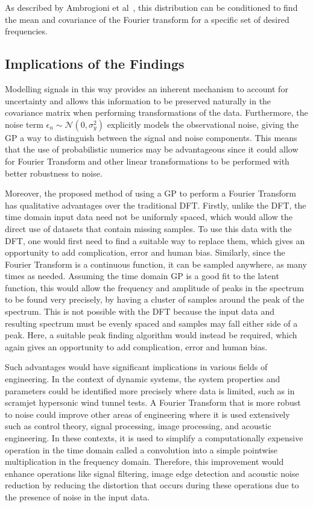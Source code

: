 \documentclass[12pt]{article}
\begin{document}
    \noindent As described by Ambrogioni et al~\cite{Ambrogioni2018}, this distribution can be conditioned to find the mean and covariance of the Fourier transform for a specific set of desired frequencies.

    \subsection{Implications of the Findings}
    Modelling signals in this way provides an inherent mechanism to account for uncertainty and allows this information to be preserved naturally in the covariance matrix when performing transformations of the data.
    Furthermore, the noise term  $\epsilon_n \sim \mathcal{N}(0, \sigma^2_y)$ explicitly models the observational noise, giving the GP a way to distinguish between the signal and noise components.
    This means that the use of probabilistic numerics may be advantageous since it could allow for Fourier Transform and other linear transformations to be performed with better robustness to noise.

    Moreover, the proposed method of using a GP to perform a Fourier Transform has qualitative advantages over the traditional DFT.
    Firstly, unlike the DFT, the time domain input data need not be uniformly spaced, which would allow the direct use of datasets that contain missing samples.
    To use this data with the DFT, one would first need to find a suitable way to replace them, which gives an opportunity to add complication, error and human bias.
    Similarly, since the Fourier Transform is a continuous function, it can be sampled anywhere, as many times as needed.
    Assuming the time domain GP is a good fit to the latent function, this would allow the frequency and amplitude of peaks in the spectrum to be found very precisely, by having a cluster of samples around the peak of the spectrum.
    This is not possible with the DFT because the input data and resulting spectrum must be evenly spaced and samples may fall either side of a peak.
    Here, a suitable peak finding algorithm would instead be required, which again gives an opportunity to add complication, error and human bias.


    Such advantages would have significant implications in various fields of engineering.
    In the context of dynamic systems, the system properties and parameters could be identified more precisely where data is limited, such as in scramjet hypersonic wind tunnel tests.
    A Fourier Transform that is more robust to noise could improve other areas of engineering where it is used extensively such as control theory, signal processing, image processing, and acoustic engineering.
    In these contexts, it is used to simplify a computationally expensive operation in the time domain called a convolution into a simple pointwise multiplication in the frequency domain.
    Therefore, this improvement would enhance operations like signal filtering, image edge detection and acoustic noise reduction by reducing the distortion that occurs during these operations due to the presence of noise in the input data.
\end{document}
